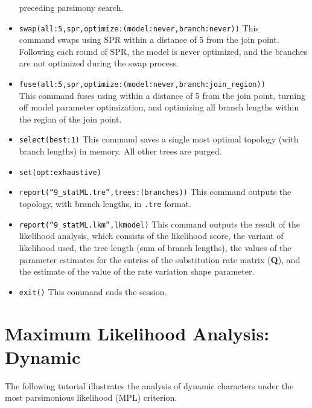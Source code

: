 \begin{itemize}
preceding parsimony search.
\item \texttt{swap(all:5,spr,optimize:(model:never,branch:never))} This \\ command swaps using SPR within a 
distance of 5 from the join point.  Following each round of SPR, the model is never optimized, and the branches 
are not optimized during the swap process.   
\item \texttt{fuse(all:5,spr,optimize:(model:never,branch:join\_region))} \\ This command fuses using 
within a distance of 5 from the join point, turning off model parameter optimization, and optimizing all branch lengths 
within the region of the join point. 
\item \texttt{select(best:1)} This command saves a single most optimal topology (with branch lengths) in 
memory. All other trees are purged.
\item \texttt{set(opt:exhaustive)}  
\item \texttt{report(``9\_statML.tre'',trees:(branches))} This command outputs the topology, with branch lengths, in 
\texttt{.tre} format.
\item \texttt{report(``9\_statML.lkm'',lkmodel)} This command outputs the result of the likelihood analysis, which 
consists of the likelihood score, the variant of likelihood used, the tree length (sum of branch lengths), the values 
of the parameter estimates for the entries of the substitution rate matrix (\textbf{Q}), and the estimate of the value of 
the rate variation shape parameter.
\item \texttt{exit()} This command ends the \poy session.
\end{itemize}


\section{Maximum Likelihood Analysis: Dynamic}{\label{tutorial13}}

The following tutorial illustrates the analysis of dynamic characters under the most parsimonious likelihood 
(MPL) criterion.  


